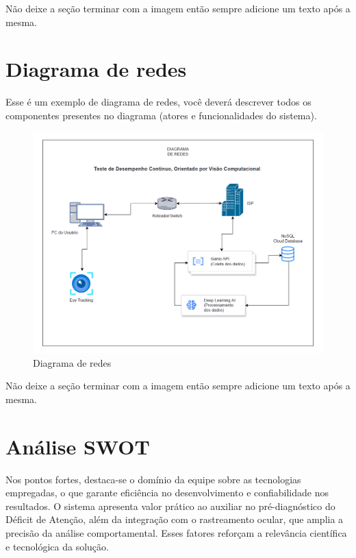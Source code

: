 \documentclass[
  a4paper,%
  12pt,%
  english,%
  brazilian,%
]{article}
\begin{document}
    Não deixe a seção terminar com a imagem então sempre adicione um texto após a mesma.

\section*{Diagrama de redes}
    
    Esse é um exemplo de diagrama de redes, você deverá descrever todos os componentes presentes no diagrama (atores e funcionalidades do sistema).

\begin{figure}[H]
\centering
\caption{Diagrama de redes}%
\label{fig:diagrama-de-redes}
\includegraphics[width=1.1\textwidth]{Logos/diagrama-de-redes.png}
\end{figure}

    Não deixe a seção terminar com a imagem então sempre adicione um texto após a mesma.

\section*{Análise SWOT}

Nos pontos fortes, destaca-se o domínio da equipe sobre as tecnologias empregadas, o que garante eficiência no desenvolvimento e confiabilidade nos resultados. O sistema apresenta valor prático ao auxiliar no pré-diagnóstico do Déficit de Atenção, além da integração com o rastreamento ocular, que amplia a precisão da análise comportamental. Esses fatores reforçam a relevância científica e tecnológica da solução.
\end{document}
